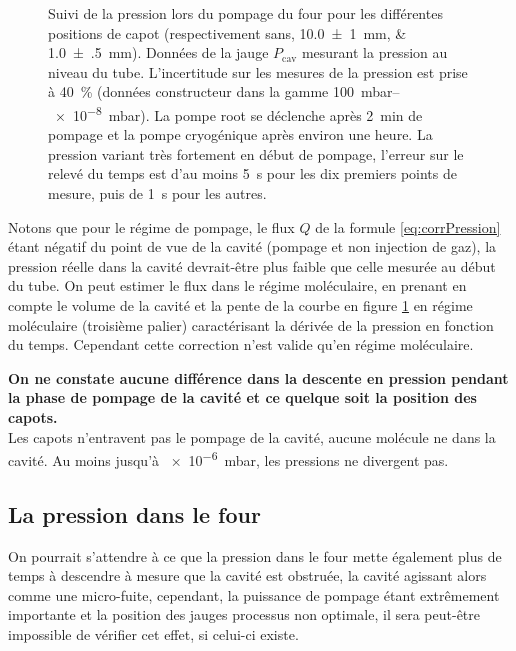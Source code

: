 %        

\begin{figure}
    \centering
    
    \caption{Suivi de la pression lors du pompage du four pour les différentes positions de capot (respectivement sans, \SIlist{10.0(10);1.0(5)}{mm}). Données de la jauge $P_\text{cav}$ mesurant la pression au niveau du tube. L'incertitude sur les mesures de la pression est prise à \SI{40}{\percent} (données constructeur dans la gamme \SIrange{100}{e-8}{\milli\bar})\cite{manuelJaugeCav}. La pompe root se déclenche après \SI{2}{\minute} de pompage et la pompe cryogénique après environ une heure. La pression variant très fortement en début de pompage, l'erreur sur le relevé du temps est d'au moins \SI{5}{\second} pour les dix premiers points de mesure, puis de \SI{1}{\second} pour les autres.}
    \label{fig:pompage_pCav}
\end{figure}

Notons que pour le régime de pompage, le flux $Q$ de la formule \ref{eq:corrPression} étant négatif du point de vue de la cavité (pompage et non injection de gaz), la pression réelle dans la cavité devrait-être plus faible que celle mesurée au début du tube. On peut estimer le flux dans le régime moléculaire, en prenant en compte le volume de la cavité et la pente de la courbe en figure \ref{fig:pompage_pCav} en régime moléculaire (troisième palier) caractérisant la dérivée de la pression en fonction du temps. Cependant cette correction n'est valide qu'en régime moléculaire.

\textbf{On ne constate aucune différence dans la descente en pression pendant la phase de pompage de la cavité et ce quelque soit la position des capots.}\\
Les capots n'entravent pas le pompage de la cavité, aucune molécule ne  dans la cavité. Au moins jusqu'à \SI{e-6}{\milli\bar}, les pressions ne divergent pas.

\subsection{La pression dans le four}
On pourrait s'attendre à ce que la pression dans le four mette également plus de temps à descendre à mesure que la cavité est obstruée, la cavité agissant alors comme une micro-fuite, cependant, la puissance de pompage étant extrêmement importante et la position des jauges processus non optimale, il sera peut-être impossible de vérifier cet effet, si celui-ci existe.

